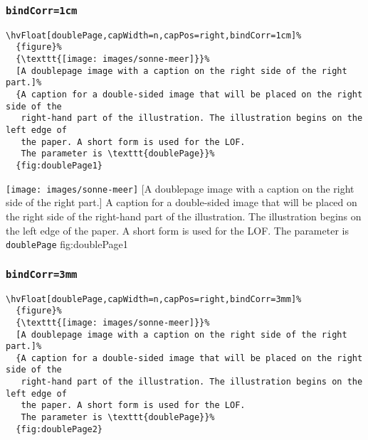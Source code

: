 \documentclass[twoside,twocolumn]{scrartcl}
\makeatletter
\let\hvBlindtext\Blindtext
\def\Blindtext{\par\color{black!40}\hvBlindtext\par\normalcolor}
\def\hvblindtext{\textcolor{black!40}{\blindtext@text}}
\makeatother
\begin{document}
\hvblindtext

\hvblindtext

\subsubsection{\texttt{bindCorr=1cm}}

\begin{lstlisting}
\hvFloat[doublePage,capWidth=n,capPos=right,bindCorr=1cm]%
  {figure}%
  {\texttt{[image: images/sonne-meer]}}%
  [A doublepage image with a caption on the right side of the right part.]%
  {A caption for a double-sided image that will be placed on the right side of the
   right-hand part of the illustration. The illustration begins on the left edge of 
   the paper. A short form is used for the LOF. 
   The parameter is \texttt{doublePage}}%
  {fig:doublePage1}
\end{lstlisting}

%
  {\texttt{[image: images/sonne-meer]}}%
  [A doublepage image with a caption on the right side of the right part.]%
  {A caption for a double-sided image that will be placed on the right side of the
   right-hand part of the illustration. The illustration begins on the left edge of 
   the paper. A short form is used for the LOF. 
   The parameter is \texttt{doublePage}}%
  {fig:doublePage1}

\hvblindtext

\Blindtext

\Blindtext

\Blindtext

\hvblindtext

\subsubsection{\texttt{bindCorr=3mm}}
\begin{lstlisting}
\hvFloat[doublePage,capWidth=n,capPos=right,bindCorr=3mm]%
  {figure}%
  {\texttt{[image: images/sonne-meer]}}%
  [A doublepage image with a caption on the right side of the right part.]%
  {A caption for a double-sided image that will be placed on the right side of the
   right-hand part of the illustration. The illustration begins on the left edge of 
   the paper. A short form is used for the LOF. 
   The parameter is \texttt{doublePage}}%
  {fig:doublePage2}
\end{lstlisting}
\end{document}
